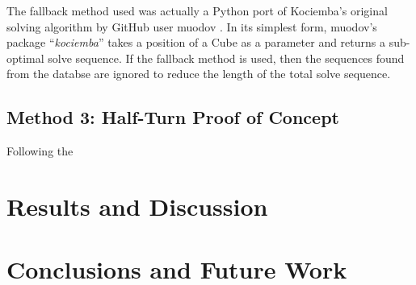 \documentclass{report}
\newcommand{\tit}[1]{\textit{#1}}
\newcommand{\propernoun}[1]{\enquote{\tit{#1}}}
\begin{document}
	The fallback method used was actually a Python port of Kociemba's original solving algorithm by GitHub user muodov \cite{muodov2018}. In its simplest form, muodov's package \propernoun{kociemba} takes a position of a Cube as a parameter and returns a sub-optimal solve sequence. If the fallback method is used, then the sequences found from the databse are ignored to reduce the length of the total solve sequence.
	
	\section{Method 3: Half-Turn Proof of Concept}
	
	Following the 
	
	
	
	
    \newpage
    \chapter{Results and Discussion}
    
    \newpage
    \chapter{Conclusions and Future Work}
    
\end{document}
